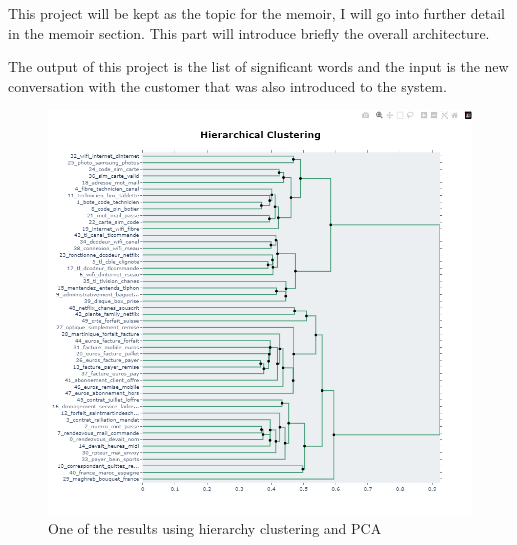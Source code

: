 This project will be kept as the topic for the memoir, I will go into further detail in the memoir section. This part will introduce briefly the overall architecture.

The output of this project is the list of significant words and the input is the new conversation with the customer that was also introduced to the system.

\begin{figure}[H]
    \centering
    \includegraphics[width=1\textwidth]{images/results/cam/hierachy_pca_tree.png}
    \caption{One of the results using hierarchy clustering and PCA}
    \label{fig:hierachy_pca}
\end{figure}
